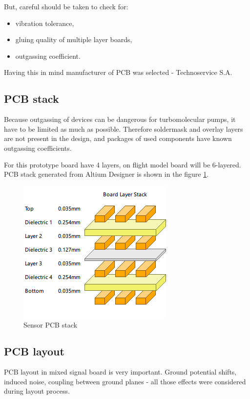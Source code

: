         But, careful should be taken to check for:
        \begin{itemize}
            \item vibration tolerance,
            \item gluing quality of multiple layer boards,
            \item outgassing coefficient.
        \end{itemize}

        Having this in mind manufacturer of PCB was selected - Technoservice S.A.

    \subsection{PCB stack}
        Because outgassing of devices can be dangerous for turbomolecular pumps, it have to be limited as much as possible. Therefore soldermask and overlay layers are not present in the design, and packages of used components have known outgassing coefficients.

        For this prototype board have 4 layers, on flight model board will be 6-layered. PCB stack generated from Altium Designer is shown in the figure \ref{PCB_Altium_stack}.

        \begin{figure}[H]
            \centering
            \includegraphics[width=0.3\paperwidth]{img/06/stack.png}
            \caption{Sensor PCB stack}
            \label{PCB_Altium_stack}
        \end{figure}

    \subsection{PCB layout}
        PCB layout in mixed signal board is very important. Ground potential shifts, induced noise, coupling between ground planes - all those effects were considered during layout process.


